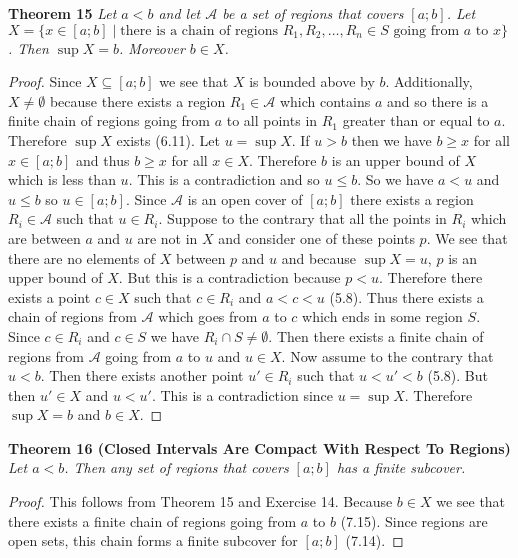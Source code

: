 \documentclass{article}
\begin{document}
\begin{flushleft}
\textbf{Theorem 15}
\textsl{Let $a<b$ and let $\mathcal{A}$ be a set of regions that covers $[a;b]$. Let $X = \{ x \in [a;b] \mid \text{there is a chain of regions } R_1, R_2, \dots ,R_n \in S \text{ going from } a \text{ to } x \}$. Then $\sup X = b$. Moreover $b \in X$.}
\begin{proof}
Since $X \subseteq [a;b]$ we see that $X$ is bounded above by $b$. Additionally, $X \neq \emptyset$ because there exists a region $R_1 \in \mathcal{A}$ which contains $a$ and so there is a finite chain of regions going from $a$ to all points in $R_1$ greater than or equal to $a$. Therefore $\sup X$ exists (6.11). Let $u = \sup X$. If $u > b$ then we have $b \geq x$ for all $x \in [a;b]$ and thus $b \geq x$ for all $x \in X$. Therefore $b$ is an upper bound of $X$ which is less than $u$. This is a contradiction and so $u \leq b$. So we have $a<u$ and $u \leq b$ so $u \in [a;b]$. Since $\mathcal{A}$ is an open cover of $[a;b]$ there exists a region $R_i \in \mathcal{A}$ such that $u \in R_i$. Suppose to the contrary that all the points in $R_i$ which are between $a$ and $u$ are not in $X$ and consider one of these points $p$. We see that there are no elements of $X$ between $p$ and $u$ and because $\sup X = u$, $p$ is an upper bound of $X$. But this is a contradiction because $p<u$. Therefore there exists a point $c \in X$ such that $c \in R_i$ and $a<c<u$ (5.8). Thus there exists a chain of regions from $\mathcal{A}$ which goes from $a$ to $c$ which ends in some region $S$. Since $c \in R_i$ and $c \in S$ we have $R_i \cap S \neq \emptyset$. Then there exists a finite chain of regions from $\mathcal{A}$ going from $a$ to $u$ and $u \in X$. Now assume to the contrary that $u<b$. Then there exists another point $u' \in R_i$ such that $u<u'<b$ (5.8). But then $u' \in X$ and $u<u'$. This is a contradiction since $u = \sup X$. Therefore $\sup X = b$ and $b \in X$.
\end{proof}

\textbf{Theorem 16 (Closed Intervals Are Compact With Respect To Regions)}
\textsl{Let $a<b$. Then any set of regions that covers $[a;b]$ has a finite subcover.}
\begin{proof}
This follows from Theorem 15 and Exercise 14. Because $b \in X$ we see that there exists a finite chain of regions going from $a$ to $b$ (7.15). Since regions are open sets, this chain forms a finite subcover for $[a;b]$ (7.14).
\end{proof}


\end{flushleft}
\end{document}
